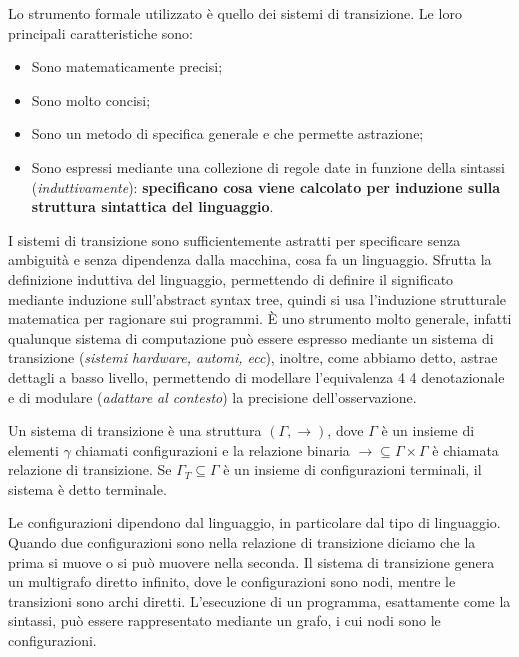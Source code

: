 \documentclass[oneside,a4paper,11pt]{book}
\theoremstyle{italicstyle}
\theoremstyle{normStyle}
\begin{document}
Lo strumento formale utilizzato è quello dei sistemi di transizione.
Le loro principali caratteristiche sono:
\begin{itemize}
  \item Sono matematicamente precisi;
  \item Sono molto concisi;
  \item Sono un metodo di specifica generale e che permette astrazione;
  \item Sono espressi mediante una collezione di regole date in funzione della sintassi (\textit{induttivamente}):
  \textbf{specificano cosa viene calcolato per induzione sulla struttura sintattica del linguaggio}.
\end{itemize}
I sistemi di transizione sono sufficientemente astratti per specificare
senza ambiguità e senza dipendenza dalla macchina, cosa fa un linguaggio.
Sfrutta la definizione induttiva del linguaggio, permettendo di definire
il significato mediante induzione sull’abstract syntax tree, quindi si usa
l’induzione strutturale matematica per ragionare sui programmi. È uno strumento
molto generale, infatti qualunque sistema di computazione può essere espresso
mediante un sistema di transizione (\textit{sistemi hardware, automi, ecc}), inoltre, come
abbiamo detto, astrae dettagli a basso livello, permettendo di modellare
l’equivalenza 4 4 denotazionale e di modulare (\textit{adattare al contesto}) la
precisione dell’osservazione. 
\begin{tcolorbox}[title={Sistema di transizioni}]
  Un sistema di transizione è una struttura $(\Gamma, \rightarrow)$,
  dove $\Gamma$ è un insieme di elementi $\gamma$ chiamati configurazioni e la
  relazione binaria $\rightarrow\subseteq \Gamma \times \Gamma$ è chiamata
  relazione di transizione.
  Se $\Gamma_T \subseteq \Gamma $ è un insieme di configurazioni terminali, il sistema è
  detto terminale.
\end{tcolorbox}
Le configurazioni dipendono dal linguaggio, in particolare dal tipo di linguaggio.
Quando due configurazioni sono nella relazione di transizione diciamo che
la prima si muove o si può muovere nella seconda. Il sistema di transizione
genera un multigrafo diretto infinito, dove le configurazioni sono nodi,
mentre le transizioni sono archi diretti. L’esecuzione di un programma,
esattamente come la sintassi, può essere rappresentato mediante un grafo,
i cui nodi sono le configurazioni.
\end{document}
